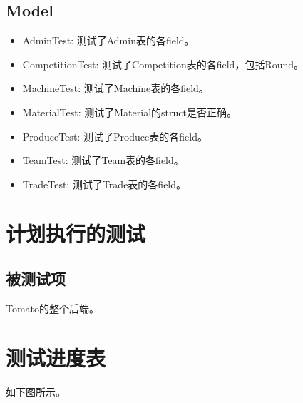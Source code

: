 \documentclass{article}
\begin{document}
					\subsection{Model}
						\begin{itemize}
							\item AdminTest: 测试了Admin表的各field。
							\item CompetitionTest: 测试了Competition表的各field，包括Round。
							\item MachineTest: 测试了Machine表的各field。
							\item MaterialTest: 测试了Material的struct是否正确。
							\item ProduceTest: 测试了Produce表的各field。
							\item TeamTest: 测试了Team表的各field。
							\item TradeTest: 测试了Trade表的各field。
						\end{itemize}
			\section{计划执行的测试}
				\subsection{被测试项}
					Tomato的整个后端。
		\section{测试进度表}
			如下图所示。
\end{document}
